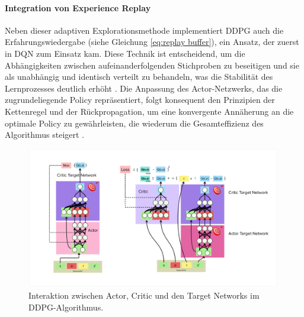 \paragraph{Integration von Experience Replay}

Neben dieser adaptiven Explorationsmethode implementiert DDPG auch die Erfahrungswiedergabe (siehe Gleichung \ref{eq:replay buffer}), ein Ansatz, der zuerst in DQN zum Einsatz kam. Diese Technik ist entscheidend, um die Abhängigkeiten zwischen aufeinanderfolgenden Stichproben zu beseitigen und sie als unabhängig und identisch verteilt zu behandeln, was die Stabilität des Lernprozesses deutlich erhöht \cite{Wu2018AggregatedMultiDDPG}. Die Anpassung des Actor-Netzwerks, das die zugrundeliegende Policy repräsentiert, folgt konsequent den Prinzipien der Kettenregel und der Rückpropagation, um eine konvergente Annäherung an die optimale Policy zu gewährleisten, die wiederum die Gesamteffizienz des Algorithmus steigert \cite{Wu2018AggregatedMultiDDPG}.

\begin{figure}[htbp]
\centering
\includegraphics[width=0.99\textwidth, trim=10px 10px 10px 10px, clip]{2Grundlagen/35critick_actor_target.png}
\caption{Interaktion zwischen Actor, Critic und den Target Networks im DDPG-Algorithmus.}
\label{fig:actor_critic_diagram}
\end{figure}

